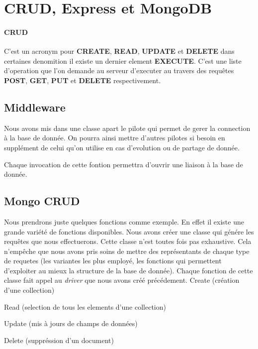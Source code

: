 \section{CRUD, Express et MongoDB}
\paragraph{CRUD}C'est un acronym pour \textbf{CREATE}, \textbf{READ}, \textbf{UPDATE} et \textbf{DELETE} dans certaines denomition il existe un dernier element \textbf{EXECUTE}. C'est une liste d'operation que l'on demande au serveur d'executer au travers des requêtes \textbf{POST}, \textbf{GET}, \textbf{PUT} et \textbf{DELETE} respectivement.
\begin{center}
\end{center}
\subsection{Middleware}
Nous avons mis dans une classe apart le pilote qui permet de gerer la connection à la base de donnée. On pourra ainsi mettre d'autres pilotes si besoin en supplément de celui qu'on utilise en cas d'evolution ou de partage de donnée.

Chaque invocation de cette fontion permettra d'ouvrir une liaison à la base de donnée.
\subsection{Mongo CRUD}
Nous prendrons juste quelques fonctions comme exemple. En effet il existe une grande variété de fonctions disponibles. Nous avons créer une classe qui génére les requêtes que nous effectuerons. Cette classe n'est toutes fois pas exhaustive. Cela n'empêche que nous avons pris soins de mettre des représentants de chaque type de requetes (les variantes les plus employé, les fonctions qui permettent d'exploiter au mieux la structure de la base de donnée).
Chaque fonction de cette classe fait appel au \textit{driver} que nous avons créé précédement.
Create (création d'une collection)

Read (selection de tous les elements d'une collection)

Update (mis à jours de champs de données)

Delete (suppréssion d'un document)
